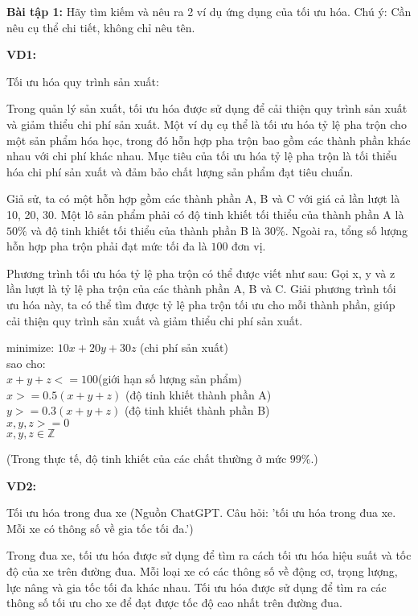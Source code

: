 \textbf{Bài tập 1:}
Hãy tìm kiếm và nêu ra 2 ví dụ ứng dụng của tối ưu hóa.
Chú ý: Cần nêu cụ thể chi tiết, không chỉ nêu tên.

\textbf{VD1:} 

 Tối ưu hóa quy trình sản xuất:%

Trong quản lý sản xuất, tối ưu hóa được 
sử dụng để cải thiện quy trình sản xuất và giảm thiểu chi phí sản xuất.
 Một ví dụ cụ thể là tối ưu hóa tỷ lệ pha trộn cho một sản phẩm hóa học, 
 trong đó hỗn hợp pha trộn bao gồm các thành phần khác nhau với chi phí 
 khác nhau. Mục tiêu của tối ưu hóa tỷ lệ pha trộn là tối thiểu hóa chi
phí sản xuất và đảm bảo chất lượng sản phẩm đạt tiêu chuẩn.

Giả sử, ta có một hỗn hợp gồm các thành phần A, B và C với giá
 cả lần lượt là 10, 20, 30. 
 Một lô sản phẩm phải có độ tinh khiết tối thiểu của thành phần A là $50\%$
  và độ tinh khiết tối thiểu của thành phần B là $30\%$.
 Ngoài ra, tổng số lượng hỗn hợp pha trộn phải đạt mức tối 
 đa là $100$ đơn vị.


Phương trình tối ưu hóa tỷ lệ pha trộn có thể được viết như sau:
Gọi x, y và z lần lượt là tỷ lệ pha trộn của các thành phần A, B và C.
 Giải phương trình tối ưu hóa này, ta có thể tìm được
  tỷ lệ pha trộn tối ưu cho mỗi thành phần, giúp cải thiện quy trình sản xuất và giảm thiểu chi phí sản xuất.

minimize: $10x + 20y + 30z$ (chi phí sản xuất)\\
sao cho:\\
$x + y + z <= 100 $(giới hạn số lượng sản phẩm)\\
$x >= 0.5(x+y+z)$ (độ tinh khiết thành phần A)\\
$y >= 0.3(x+y+z)$ (độ tinh khiết thành phần B)\\
$x,y,z >= 0 $\\
$x,y,z \in \mathbb{Z}$

(Trong thực tế, độ tinh khiết của các chất thường ở mức $99\%$.)

\textbf{VD2:} 

Tối ưu hóa trong đua xe (Nguồn ChatGPT. Câu hỏi: 
'tối ưu hóa trong đua xe. Mỗi xe có thông số về gia tốc tối đa.')

Trong đua xe, tối ưu hóa được sử dụng để tìm ra cách tối ưu hóa hiệu suất và tốc độ của xe trên đường đua. Mỗi loại xe có các thông số về động cơ, trọng lượng, lực nâng và gia tốc tối đa khác nhau. Tối ưu hóa được sử dụng để tìm ra các thông số tối ưu cho xe để đạt được tốc độ cao nhất trên đường đua.

